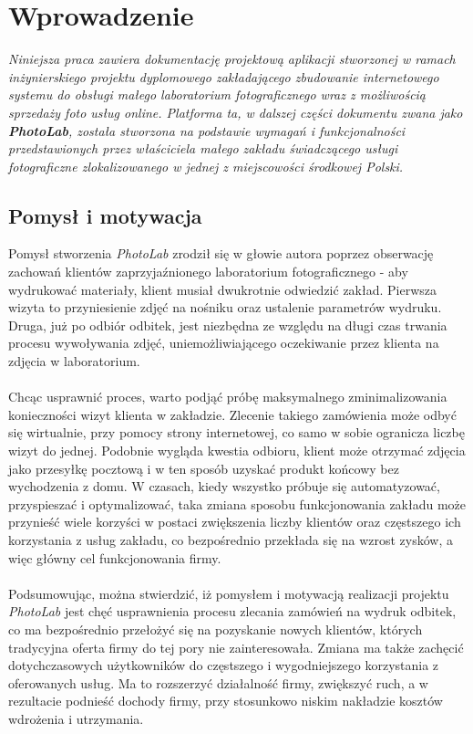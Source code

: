 \chapter{Wprowadzenie} \label{rozdz.Wprowadzenie} 
{\em \quad Niniejsza praca zawiera dokumentację projektową aplikacji stworzonej w ramach inżynierskiego projektu dyplomowego zakładającego zbudowanie internetowego systemu do obsługi małego laboratorium fotograficznego wraz z możliwością sprzedaży foto usług online. Platforma ta, w dalszej części dokumentu zwana jako \textbf{PhotoLab}, została stworzona na podstawie wymagań i funkcjonalności przedstawionych przez właściciela małego zakładu świadczącego usługi fotograficzne zlokalizowanego w jednej z miejscowości środkowej Polski.
}

\section{Pomysł i motywacja}
\quad Pomysł stworzenia \textit{PhotoLab} zrodził się w głowie autora poprzez obserwację zachowań klientów zaprzyjaźnionego laboratorium fotograficznego - aby wydrukować materiały, klient musiał dwukrotnie odwiedzić zakład. Pierwsza wizyta to przyniesienie zdjęć na nośniku oraz ustalenie parametrów wydruku. Druga, już po odbiór odbitek, jest niezbędna ze względu na długi czas trwania procesu wywoływania zdjęć, uniemożliwiającego oczekiwanie przez klienta na zdjęcia w laboratorium.\\
\\
Chcąc usprawnić proces, warto podjąć próbę maksymalnego zminimalizowania konieczności wizyt klienta w zakładzie. Zlecenie takiego zamówienia może odbyć się wirtualnie, przy pomocy strony internetowej, co samo w sobie ogranicza liczbę wizyt do jednej. Podobnie wygląda kwestia odbioru, klient może otrzymać zdjęcia jako przesyłkę pocztową i w ten sposób uzyskać produkt końcowy bez wychodzenia z domu. W czasach, kiedy wszystko próbuje się automatyzować, przyspieszać i optymalizować, taka zmiana sposobu funkcjonowania zakładu może przynieść wiele korzyści w postaci zwiększenia liczby klientów oraz częstszego ich korzystania z usług zakładu, co bezpośrednio przekłada się na wzrost zysków, a więc główny cel funkcjonowania firmy. \\
\\
Podsumowując, można stwierdzić, iż pomysłem i motywacją realizacji projektu \textit{PhotoLab} jest chęć usprawnienia procesu zlecania zamówień na wydruk odbitek, co ma bezpośrednio przełożyć się na pozyskanie nowych klientów, których tradycyjna oferta firmy do tej pory nie zainteresowała. Zmiana ma także zachęcić dotychczasowych użytkowników do częstszego i wygodniejszego korzystania z oferowanych usług. Ma to rozszerzyć działalność firmy, zwiększyć ruch, a w rezultacie podnieść dochody firmy, przy stosunkowo niskim nakładzie kosztów wdrożenia i utrzymania.


